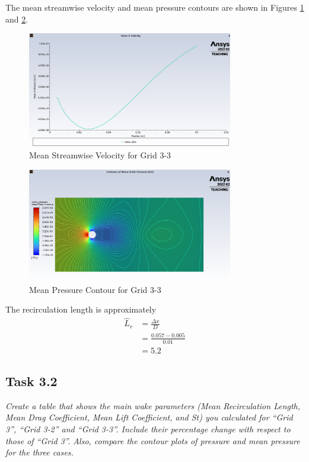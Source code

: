 The mean streamwise velocity and mean pressure contours are shown in Figures \ref{fig:mean x velocity along wake center line grid 3 3} and \ref{fig:mean pressure velocity contour grid 3 3}.
\begin{figure}[H]
    \centering
    \includegraphics[width=0.8\textwidth]{Questions/Figures/mean x velocity along wake center line grid 3 3.png}
    \caption{Mean Streamwise Velocity for Grid 3-3}
    \label{fig:mean x velocity along wake center line grid 3 3}
\end{figure}
\begin{figure}[H]
    \centering
    \includegraphics[width=0.8\textwidth]{Questions/Figures/mean pressure velocity contour grid 3 3.png}
    \caption{Mean Pressure Contour for Grid 3-3}
    \label{fig:mean pressure velocity contour grid 3 3}
\end{figure}
The recirculation length is approximately
\begin{align*}
    \hat{L}_r &= \frac{\Delta x}{D} \\
    &= \frac{0.057 - 0.005}{0.01} \\
    &= \boxed{5.2}
\end{align*}

\subsection{Task 3.2}
\textit{Create a table that shows the main wake parameters (Mean Recirculation Length, Mean Drag Coefficient, Mean Lift Coefficient, and St) you calculated for “Grid 3”, “Grid 3-2” and “Grid 3-3”. Include their percentage change with respect to those of “Grid 3”. Also, compare the contour plots of pressure and mean pressure for the three cases.}

